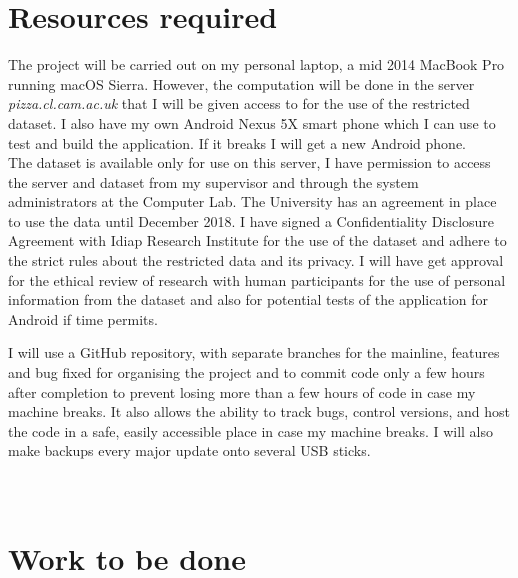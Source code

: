\documentclass[12pt,a4paper,twoside]{article}
\begin{document}
\section*{Resources required}
The project will be carried out on my personal laptop, a mid 2014 MacBook Pro running macOS Sierra. However, the computation will be done in the server \textit{pizza.cl.cam.ac.uk} that I will be given access to for the use of the restricted dataset\cite{dataset}. I also have my own Android Nexus 5X smart phone which I can use to test and build the application. If it breaks I will get a new Android phone.\\
The dataset is available only for use on this server, I have permission to access the server and dataset from my supervisor and through the system administrators at the Computer Lab. The University has an agreement in place to use the data until December 2018. I have signed a Confidentiality Disclosure Agreement with Idiap Research Institute for the use of the dataset and adhere to the strict rules about the restricted data and its privacy.
I will have get approval for the ethical review of research with human participants for the use of personal information from the dataset and also for potential tests of the application for Android if time permits.

I will use a GitHub repository, with separate branches for the mainline, features and bug fixed for organising the project and to commit code only a few hours after completion to prevent losing more than a few hours of code in case my machine breaks. It also allows the ability to track bugs, control versions, and host the code in a safe, easily accessible place in case my machine breaks. I will also make backups every major update onto several USB sticks.\\\\\\

\section*{Work to be done}
\end{document}
